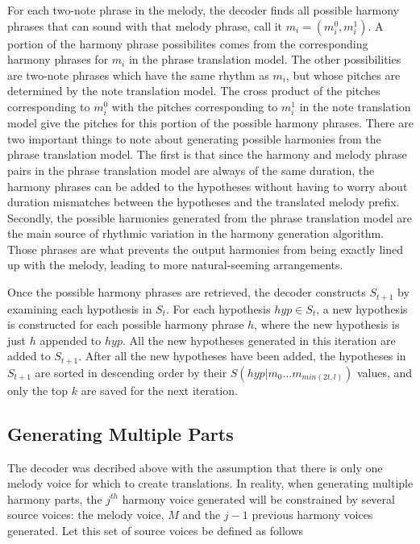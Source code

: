 \documentclass{sig-alternate}
\begin{document}
For each two-note phrase in the melody, the decoder finds all possible harmony phrases that can sound with that melody phrase, call it $m_{i} = (m_{i}^{0}, m_{i}^{1})$. A portion of the harmony phrase possibilites comes from the corresponding harmony phrases for $m_{i}$ in the phrase translation model. The other possibilities are two-note phrases which have the same rhythm as $m_{i}$, but whose pitches are determined by the note translation model. The cross product of the pitches corresponding to $m_{i}^{0}$ with the pitches corresponding to $m_{i}^{1}$ in the note translation model give the pitches for this portion of the possible harmony phrases. There are two important things to note about generating possible harmonies from the phrase translation model. The first is that since the harmony and melody phrase pairs in the phrase translation model are always of the same duration, the harmony phrases can be added to the hypotheses without having to worry about duration mismatches between the hypotheses and the translated melody prefix. Secondly, the possible harmonies generated from the phrase translation model are the main source of rhythmic variation in the harmony generation algorithm. Those phrases are what prevents the output harmonies from being exactly lined up with the melody, leading to more natural-seeming arrangements.

Once the possible harmony phrases are retrieved, the decoder constructs $S_{t + 1}$ by examining each hypothesis in $S_{t}$. For each hypothesis $hyp \in S_{t}$, a new hypothesis is constructed for each possible harmony phrase $h$, where the new hypothesis is just $h$ appended to $hyp$. All the new hypotheses generated in this iteration are added to $S_{t + 1}$. After all the new hypotheses have been added, the hypotheses in $S_{t + 1}$ are sorted in descending order by their $S(hyp | m_{0} ... m_{min(2t, l)})$ values, and only the top $k$ are saved for the next iteration.

\subsection {Generating Multiple Parts}
The decoder was decribed above with the assumption that there is only one melody voice for  which to create translations. In reality, when generating multiple harmony parts, the $j^{th}$ harmony voice generated will be constrained by several source voices: the melody voice, $M$ and the $j-1$ previous harmony voices generated. Let this set of source voices be defined as follows\\
\end{document}
